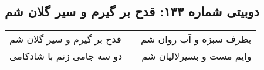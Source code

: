 \begin{center}
\section*{دوبیتی شماره ۱۳۳: قدح بر گیرم و سیر گلان شم}
\label{sec:133}
\begin{longtable}{l p{0.5cm} r}
قدح بر گیرم و سیر گلان شم
&&
بطرف سبزه و آب روان شم
\\
دو سه جامی زنم با شادکامی
&&
وایم مست و بسیرلالیان شم
\\
\end{longtable}
\end{center}
